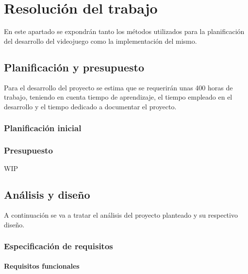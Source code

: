 \chapter{Resolución del trabajo}
\label{chap:resolucion}

En este apartado se expondrán tanto los métodos utilizados para la planificación del 
desarrollo del videojuego como la implementación del mismo.  

\section{Planificación y presupuesto}
\label{sec:planificacion}
Para el desarrollo del proyecto se estima que se requerirán  unas 400 horas de trabajo, teniendo en cuenta tiempo de aprendizaje, el tiempo empleado en el desarrollo y el tiempo dedicado a documentar el proyecto.

\subsection{Planificación inicial}


\subsection{Presupuesto}
WIP

\section{Análisis y diseño}
\label{sec:analisis}

A continuación se va a tratar el análisis del proyecto planteado y su respectivo diseño.

\subsection{Especificación de requisitos}

\subsubsection{Requisitos funcionales}

